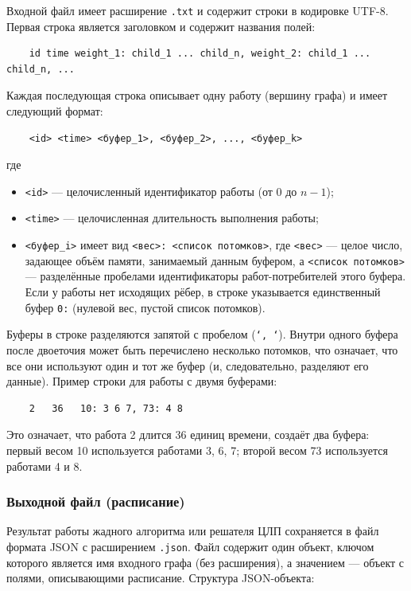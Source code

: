 Входной файл имеет расширение \texttt{.txt} и содержит строки в кодировке UTF-8.  
Первая строка является заголовком и содержит названия полей:
\begin{verbatim}
	id time weight_1: child_1 ... child_n, weight_2: child_1 ... child_n, ...
\end{verbatim}

Каждая последующая строка описывает одну работу (вершину графа) и имеет следующий формат:
\begin{verbatim}
	<id> <time> <буфер_1>, <буфер_2>, ..., <буфер_k>
\end{verbatim}
где
\begin{itemize}
	\item \texttt{<id>} — целочисленный идентификатор работы (от 0 до $n-1$);
	\item \texttt{<time>} — целочисленная длительность выполнения работы;
	\item \texttt{<буфер\_i>} имеет вид \texttt{<вес>: <список потомков>}, где \texttt{<вес>} — целое число, задающее объём памяти, занимаемый данным буфером, а \texttt{<список потомков>} — разделённые пробелами идентификаторы работ-потребителей этого буфера. Если у работы нет исходящих рёбер, в строке указывается единственный буфер \texttt{0:} (нулевой вес, пустой список потомков).
\end{itemize}

Буферы в строке разделяются запятой с пробелом (\texttt{`, `}). Внутри одного буфера после двоеточия может быть перечислено несколько потомков, что означает, что все они используют один и тот же буфер (и, следовательно, разделяют его данные). Пример строки для работы с двумя буферами:
\begin{verbatim}
	2   36   10: 3 6 7, 73: 4 8
\end{verbatim}
Это означает, что работа 2 длится 36 единиц времени, создаёт два буфера: первый весом 10 используется работами 3, 6, 7; второй весом 73 используется работами 4 и 8.

\subsubsection*{Выходной файл (расписание)}

Результат работы жадного алгоритма или решателя ЦЛП сохраняется в файл формата JSON с расширением \texttt{.json}. Файл содержит один объект, ключом которого является имя входного графа (без расширения), а значением — объект с полями, описывающими расписание. Структура JSON-объекта:

